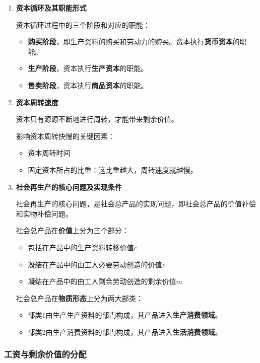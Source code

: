 \documentclass[12pt, a4paper, oneside]{ctexart}
\begin{document}
\begin{enumerate}
  \item {\bf 资本循环及其职能形式}
  
  资本循环过程中的三个阶段和对应的职能：
  \begin{itemize}
    \item {\bf 购买阶段}，即生产资料的购买和劳动力的购买。资本执行\textbf{货币资本}的职能。
    \item {\bf 生产阶段}，资本执行\textbf{生产资本}的职能。
    \item {\bf 售卖阶段}，资本执行\textbf{商品资本}的职能。
  \end{itemize}

  \item {\bf 资本周转速度}
  
  资本只有源源不断地进行周转，才能带来剩余价值。

  影响资本周转快慢的关键因素：
  \begin{itemize}
    \item 资本周转时间
    \item 固定资本所占的比重：这比重越大，周转速度就越慢。
  \end{itemize}

  \item {\bf 社会再生产的核心问题及实现条件}
  
  社会再生产的核心问题，是社会总产品的实现问题，即社会总产品的价值补偿和实物补偿问题。
  
  社会总产品在\textbf{价值}上分为三个部分：
  \begin{itemize}
    \item 包括在产品中的生产资料转移价值$c$
    \item 凝结在产品中的由工人必要劳动创造的价值$v$
    \item 凝结在产品中的由工人剩余劳动创造的剩余价值$m$
  \end{itemize}

  社会总产品在\textbf{物质形态}上分为两大部类：
  \begin{itemize}
    \item 部类1由生产生产资料的部门构成，其产品进入\textbf{生产消费领域}。
    \item 部类2由生产消费资料的部门构成，其产品进入\textbf{生活消费领域}。
  \end{itemize}
\end{enumerate}

\subsubsection{工资与剩余价值的分配}
\end{document}

